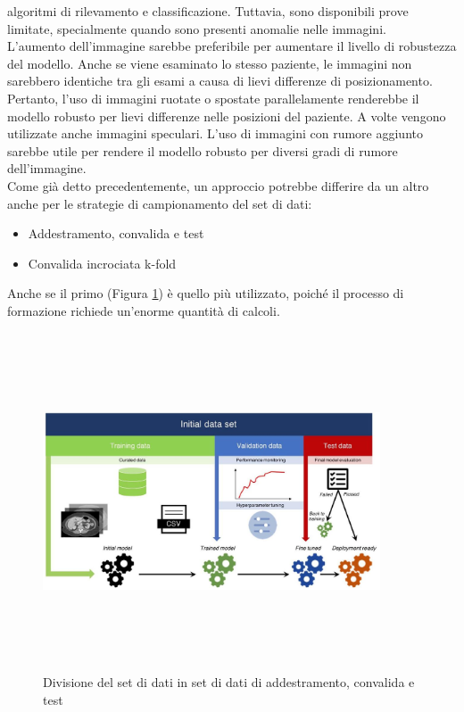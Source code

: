 \documentclass[12pt,a4paper]{report}
\begin{document}
algoritmi di rilevamento e classificazione. Tuttavia, sono disponibili prove limitate, specialmente quando sono presenti anomalie nelle immagini.\\
L'aumento dell'immagine sarebbe preferibile per aumentare il livello di robustezza del modello.
Anche se viene esaminato lo stesso paziente, le immagini non sarebbero identiche tra gli esami a causa di lievi differenze di posizionamento. 
Pertanto, l'uso di immagini ruotate o spostate parallelamente renderebbe il modello robusto per lievi differenze nelle posizioni del paziente. A volte vengono utilizzate anche immagini speculari. L'uso di immagini con rumore aggiunto sarebbe utile per rendere il modello robusto per diversi gradi di rumore dell'immagine.\\

Come già detto precedentemente, un approccio potrebbe differire da un altro anche per le strategie di campionamento del set di dati:
\begin{itemize}
    \item Addestramento, convalida e test
    \item Convalida incrociata k-fold
\end{itemize}
Anche se il primo (Figura \ref{fig:data-sampling-radiology}) è quello più utilizzato, poiché il processo di formazione richiede un'enorme quantità di calcoli.\\

\begin{figure}[h!]
    \begin{center}
        \includegraphics[width=10cm,height=10cm,keepaspectratio]{Data_radiology}
    \end{center}
    \caption{Divisione del set di dati in set di dati di addestramento, convalida e test}
    \label{fig:data-sampling-radiology}
\end{figure}
\end{document}
